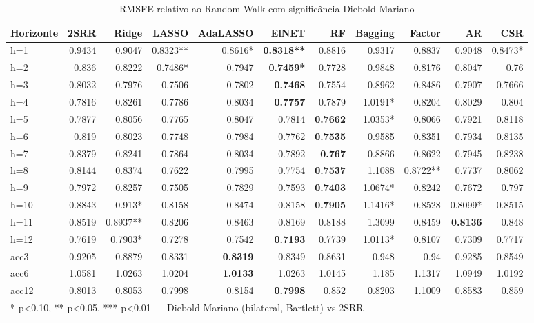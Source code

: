 \begin{table}[ht]
\centering
\caption{RMSFE relativo ao Random Walk com significância Diebold-Mariano}
\label{tab:rmsfe_dm}
{\footnotesize
\begin{tabular}{lrrrrrrrrrr}
\hline
Horizonte & 2SRR & Ridge & LASSO & AdaLASSO & ElNET & RF & Bagging & Factor & AR & CSR \\
\hline
h=1 & 0.9434 & 0.9047 & 0.8323** & 0.8616* & \textbf{0.8318**} & 0.8816 & 0.9317 & 0.8837 & 0.9048 & 0.8473* \\
h=2 & 0.836 & 0.8222 & 0.7486* & 0.7947 & \textbf{0.7459*} & 0.7728 & 0.9848 & 0.8176 & 0.8047 & 0.76 \\
h=3 & 0.8032 & 0.7976 & 0.7506 & 0.7802 & \textbf{0.7468} & 0.7554 & 0.8962 & 0.8486 & 0.7907 & 0.7666 \\
h=4 & 0.7816 & 0.8261 & 0.7786 & 0.8034 & \textbf{0.7757} & 0.7879 & 1.0191* & 0.8204 & 0.8029 & 0.804 \\
h=5 & 0.7877 & 0.8056 & 0.7765 & 0.8047 & 0.7814 & \textbf{0.7662} & 1.0353* & 0.8066 & 0.7921 & 0.8118 \\
h=6 & 0.819 & 0.8023 & 0.7748 & 0.7984 & 0.7762 & \textbf{0.7535} & 0.9585 & 0.8351 & 0.7934 & 0.8135 \\
h=7 & 0.8379 & 0.8241 & 0.7864 & 0.8034 & 0.7892 & \textbf{0.767} & 0.8866 & 0.8622 & 0.7945 & 0.8238 \\
h=8 & 0.8144 & 0.8374 & 0.7622 & 0.7995 & 0.7754 & \textbf{0.7537} & 1.1088 & 0.8722** & 0.7737 & 0.8062 \\
h=9 & 0.7972 & 0.8257 & 0.7505 & 0.7829 & 0.7593 & \textbf{0.7403} & 1.0674* & 0.8242 & 0.7672 & 0.797 \\
h=10 & 0.8843 & 0.913* & 0.8158 & 0.8474 & 0.8158 & \textbf{0.7905} & 1.1416* & 0.8528 & 0.8099* & 0.8515 \\
h=11 & 0.8519 & 0.8937** & 0.8206 & 0.8463 & 0.8169 & 0.8188 & 1.3099 & 0.8459 & \textbf{0.8136} & 0.848 \\
h=12 & 0.7619 & 0.7903* & 0.7278 & 0.7542 & \textbf{0.7193} & 0.7739 & 1.0113* & 0.8107 & 0.7309 & 0.7717 \\
acc3 & 0.9205 & 0.8879 & 0.8331 & \textbf{0.8319} & 0.8349 & 0.8631 & 0.948 & 0.94 & 0.9285 & 0.8549 \\
acc6 & 1.0581 & 1.0263 & 1.0204 & \textbf{1.0133} & 1.0263 & 1.0145 & 1.185 & 1.1317 & 1.0949 & 1.0192 \\
acc12 & 0.8013 & 0.8053 & 0.7998 & 0.8154 & \textbf{0.7998} & 0.852 & 0.8203 & 1.1009 & 0.8583 & 0.859 \\
\hline
\multicolumn{11}{l}{\scriptsize{* p<0.10, ** p<0.05, *** p<0.01 — Diebold-Mariano (bilateral, Bartlett) vs 2SRR}}\\
\end{tabular}
}
\end{table}
